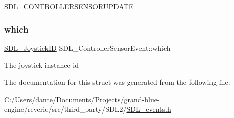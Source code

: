 \mbox{\hyperlink{_s_d_l__events_8h_a3b589e89be6b35c02e0dd34a55f3fccaafa7a5589ea54330547713f4c80b4437e}{S\+D\+L\+\_\+\+C\+O\+N\+T\+R\+O\+L\+L\+E\+R\+S\+E\+N\+S\+O\+R\+U\+P\+D\+A\+TE}} \mbox{\label{struct_s_d_l___controller_sensor_event_acf40e0528d7147725dfc94cc96618d4d}} 
\subsubsection{\texorpdfstring{which}{which}}
{\footnotesize\ttfamily \mbox{\hyperlink{_s_d_l__joystick_8h_a3c3d32500cb08f76ee8077983912c0bd}{S\+D\+L\+\_\+\+Joystick\+ID}} S\+D\+L\+\_\+\+Controller\+Sensor\+Event\+::which}

The joystick instance id 

The documentation for this struct was generated from the following file\+:\begin{DoxyCompactItemize}
\item 
C\+:/\+Users/dante/\+Documents/\+Projects/grand-\/blue-\/engine/reverie/src/third\+\_\+party/\+S\+D\+L2/\mbox{\hyperlink{_s_d_l__events_8h}{S\+D\+L\+\_\+events.\+h}}\end{DoxyCompactItemize}

